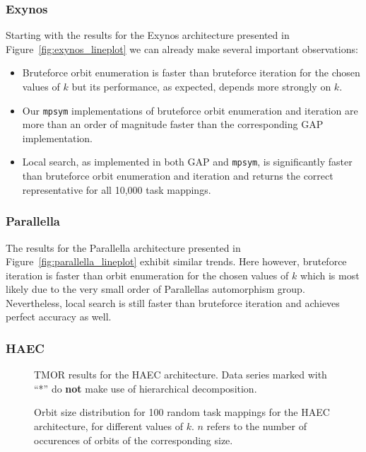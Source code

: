 \subsubsection{Exynos}

Starting with the results for the Exynos architecture presented in
Figure~\ref{fig:exynos_lineplot} we can already make several important
observations:
%
\begin{itemize}
  \item Bruteforce orbit enumeration is faster than bruteforce iteration for
        the chosen values of $k$ but its performance, as expected, depends
        more strongly on $k$.
  \item Our \texttt{mpsym} implementations of bruteforce orbit enumeration and
        iteration are more than an order of magnitude faster than the
        corresponding GAP implementation.
  \item Local search, as implemented in both GAP and \texttt{mpsym}, is
        significantly faster than bruteforce orbit enumeration and iteration and
        returns the correct representative for all 10,000 task mappings.
\end{itemize}

\subsubsection{Parallella}

The results for the Parallella architecture presented in
Figure~\ref{fig:parallella_lineplot} exhibit similar trends. Here however,
bruteforce iteration is faster than orbit enumeration for the chosen
values of $k$ which is most likely due to the very small order of Parallellas
automorphism group. Nevertheless, local search is still faster than bruteforce
iteration and achieves perfect accuracy as well.

\subsubsection{HAEC}

\begin{figure}
  \centering
  \caption{TMOR results for the HAEC architecture. Data series marked with
           ``*'' do \textbf{not} make use of hierarchical decomposition.}
  \label{fig:haec_lineplot}
  \vspace{1cm}
  \caption{Orbit size distribution for 100 random task mappings for the HAEC
           architecture, for different values of $k$. $n$ refers to the number
           of occurences of orbits of the corresponding size.}
  \label{fig:haec_histogram}
\end{figure}

